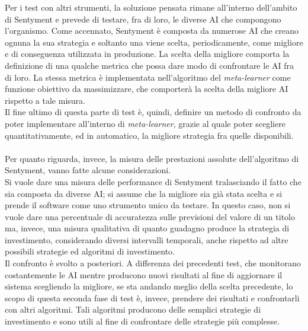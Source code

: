 \documentclass[a4paper,12pt]{report}
\begin{document}
Per i test con altri strumenti, la soluzione pensata rimane all'interno dell'ambito di Sentyment e prevede di testare, fra di loro, le diverse AI che compongono l'organismo. Come accennato, Sentyment è composta da numerose AI che creano ognuna la sua strategia e soltanto una viene scelta, periodicamente, come migliore e di conseguenza utilizzata in produzione. La scelta della migliore comporta la definizione di una qualche metrica che possa dare modo di confrontare le AI fra di loro. La stessa metrica è implementata nell'algoritmo del \textit{meta-learner} come funzione obiettivo da massimizzare, che comporterà la scelta della migliore AI rispetto a tale misura.\\ Il fine ultimo di questa parte di test è, quindi, definire un metodo di confronto da poter implementare all'interno di \textit{meta-learner}, grazie al quale poter scegliere quantitativamente, ed in automatico, la migliore strategia fra quelle disponibili.\\~\\ Per quanto riguarda, invece, la misura delle prestazioni assolute dell'algoritmo di Sentyment, vanno fatte alcune considerazioni.\\ Si vuole dare una misura delle performance di Sentyment tralasciando il fatto che sia composta da diverse AI; si assume che la migliore sia già stata scelta e si prende il software come uno strumento unico da testare. In questo caso, non si vuole dare una percentuale di accuratezza sulle previsioni del valore di un titolo ma, invece, una misura qualitativa di quanto guadagno produce la strategia di investimento, considerando diversi intervalli temporali, anche rispetto ad altre possibili strategie ed algoritmi di investimento.\\ Il confronto è svolto a posteriori. A differenza dei precedenti test, che monitorano costantemente le AI mentre producono nuovi risultati al fine di aggiornare il sistema scegliendo la migliore, se sta andando meglio della scelta precedente, lo scopo di questa seconda fase di test è, invece, prendere dei risultati e confrontarli con altri algoritmi. Tali algoritmi producono delle semplici strategie di investimento e sono utili al fine di confrontare delle strategie più complesse.\\
\end{document}
